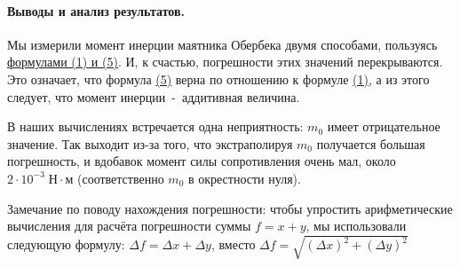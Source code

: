 \documentclass{article}
\begin{document}
\paragraph{Выводы и анализ результатов.}
Мы измерили момент инерции маятника Обербека двумя способами, пользуясь \hyperlink{formuls}{формулами (1) и (5)}. И, к счастью, погрешности этих значений перекрываются. Это означает, что формула \hyperlink{formuls}{(5)} верна по отношению к формуле \hyperlink{formuls}{(1)}, а из этого следует, что момент инерции~-~аддитивная величина. 

В наших вычислениях встречается одна неприятность: $m_0$ имеет отрицательное значение. Так выходит из-за того, что экстраполируя $m_0$ получается большая погрешность, и вдобавок момент силы сопротивления очень мал, около $2\cdot10^{-3}\;\mbox{Н}\cdot\mbox{м}$ (соответственно $m_0$ в окрестности нуля).

Замечание по поводу нахождения погрешности: чтобы упростить арифметические вычисления для расчёта погрешности суммы $f=x+y$, мы использовали следующую формулу: $\Delta f=\Delta x + \Delta y$, вместо $\Delta f = \sqrt{(\Delta x)^2 + (\Delta y)^2 }$
\end{document}
